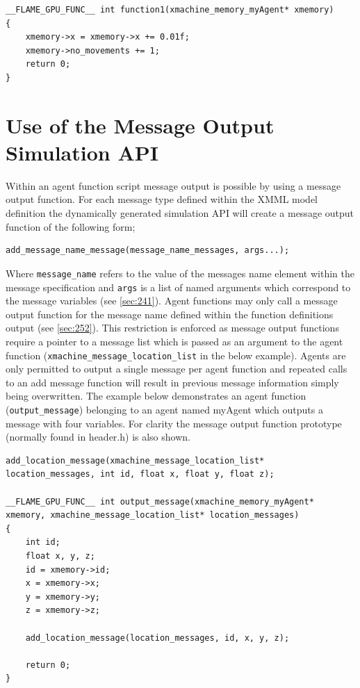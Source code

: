 \documentclass[11pt, a4paper, onecolumn, oneside]{report}
\begin{document}
\begin{verbatim}
__FLAME_GPU_FUNC__ int function1(xmachine_memory_myAgent* xmemory)
{
    xmemory->x = xmemory->x += 0.01f;
    xmemory->no_movements += 1;
    return 0;
}
\end{verbatim}

\section{Use of the Message Output Simulation API}
\label{sec:34}


Within an agent function script message output is possible by using a message output function.
For each message type defined within the XMML model definition the dynamically generated simulation API will create a message output function of the following form; 


\begin{verbatim}
add_message_name_message(message_name_messages, args...);
\end{verbatim}

Where \texttt{message_name} refers to the value of the messages name element within the message specification and \texttt{args} is a list of named arguments which correspond to the message variables (see \cref{sec:241}).
Agent functions may only call a message output function for the message name defined within the function definitions output (see \cref{sec:252}).
This restriction is enforced as message output functions require a pointer to a message list which is passed as an argument to the agent function (\texttt{xmachine_message_location_list} in the below example).
Agents are only permitted to output a single message per agent function and repeated calls to an add message function will result in previous message information simply being overwritten.
The example below demonstrates an agent function (\texttt{output_message}) belonging to an agent named myAgent which outputs a message with four variables.
For clarity the message output function prototype (normally found in header.h) is also shown.

\begin{verbatim}
add_location_message(xmachine_message_location_list* location_messages, int id, float x, float y, float z);

__FLAME_GPU_FUNC__ int output_message(xmachine_memory_myAgent* xmemory, xmachine_message_location_list* location_messages)
{
    int id;
    float x, y, z;
    id = xmemory->id;
    x = xmemory->x;
    y = xmemory->y;
    z = xmemory->z;

    add_location_message(location_messages, id, x, y, z);

    return 0;
}
\end{verbatim}
\end{document}
